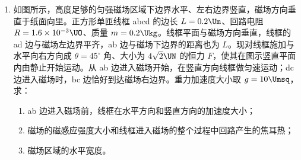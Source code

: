 \documentclass[\gkver]{gaokaozhenti}
\begin{document}
\begin{enumerate}
{	（2）因 $\tan\theta=\frac{4}{3}$ 可知 $\theta=53^{\circ}$，从 A 点射到水面的光线的入射角为 $\alpha$，折射角为 $90^{\circ}-\theta=37^{\circ}$，则由折射定律可知

	$n=\frac{\sin\alpha}{\sin 37^{\circ}}$

	解得 $\alpha=53^{\circ}$

	由几何关系可知

	$H\tan 37^{\circ}+\frac{2}{3}d\tan 53^{\circ}=d$

	解得 $H=\frac{4d}{27}$。
}

\item
如图所示，高度足够的匀强磁场区域下边界水平、左右边界竖直，磁场方向垂直于纸面向里。正方形单匝线框 abcd 的边长 $L=0.2\Um$、回路电阻 $R=1.6\times 10^{-3}\UO$、质量 $m=0.2\Ukg$。线框平面与磁场方向垂直，线框的 ad 边与磁场左边界平齐，ab 边与磁场下边界的距离也为 $L$。现对线框施加与水平向右方向成 $\theta=45^{\circ}$ 角、大小为 $4\sqrt{2}\UN$ 的恒力 $F$，使其在图示竖直平面内由静止开始运动。从 ab 边进入磁场开始，在竖直方向线框做匀速运动；dc 边进入磁场时，bc 边恰好到达磁场右边界。重力加速度大小取 $g=10\Umsq$，求：
\begin{enumerate}
	\item
	ab 边进入磁场前，线框在水平方向和竖直方向的加速度大小；
	\item
	磁场的磁感应强度大小和线框进入磁场的整个过程中回路产生的焦耳热；
	\item
	磁场区域的水平宽度。
\end{enumerate}

\end{enumerate}
\end{document}
